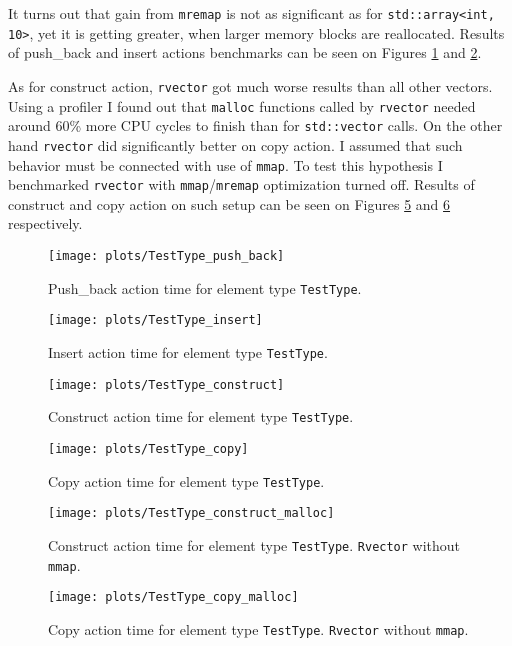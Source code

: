 \documentclass[inz, english, shortabstract]{iithesis}
\begin{document}
It turns out that gain from {\tt mremap} is not as significant as for \lstinline{std::array<int, 10>}, yet it is getting greater, when larger memory blocks are reallocated. Results of push\_back and insert actions benchmarks can be seen on Figures \ref{TestType_push_back} and \ref{TestType_insert}. 

As for construct action, {\tt rvector} got much worse results than all other vectors. Using a profiler I found out that {\tt malloc} functions called by {\tt rvector} needed around 60\% more CPU cycles to finish than for {\tt std::vector} calls. On the other hand {\tt rvector} did significantly better on copy action. I assumed that such behavior must be connected with use of {\tt mmap}. To test this hypothesis I benchmarked {\tt rvector} with {\tt mmap}/{\tt mremap} optimization turned off. Results of construct and copy action on such setup can be seen on Figures \ref{TestType_construct_malloc} and \ref{TestType_copy_malloc} respectively.

\begin{figure}[h!]
\texttt{[image: plots/TestType\_push\_back]}
\caption{Push\_back action time for element type \lstinline{TestType}.}
\label{TestType_push_back}
\end{figure}

\begin{figure}[h!]
\texttt{[image: plots/TestType\_insert]}
\caption{Insert action time for element type \lstinline{TestType}.}
\label{TestType_insert}
\end{figure}

\begin{figure}[h!]
\texttt{[image: plots/TestType\_construct]}
\caption{Construct action time for element type \lstinline{TestType}.}
\label{TestType_construct}
\end{figure}

\begin{figure}[h!]
\texttt{[image: plots/TestType\_copy]}
\caption{Copy action time for element type \lstinline{TestType}.}
\label{TestType_copy}
\end{figure}


\begin{figure}[h!]
\texttt{[image: plots/TestType\_construct\_malloc]}
\caption{Construct action time for element type \lstinline{TestType}. {\tt Rvector} without {\tt mmap}.}
\label{TestType_construct_malloc}
\end{figure}

\begin{figure}[h!]
\texttt{[image: plots/TestType\_copy\_malloc]}
\caption{Copy action time for element type \lstinline{TestType}. {\tt Rvector} without {\tt mmap}.}
\label{TestType_copy_malloc}
\end{figure}
\end{document}

